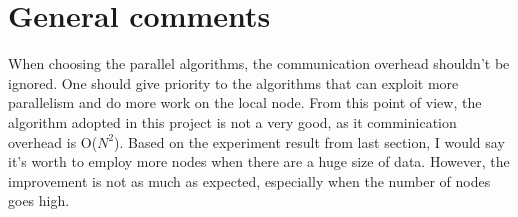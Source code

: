 \documentclass[11pt,letterpaper,oneside]{article}
\begin{document}
% 
\begin{table}[th]
\caption{Result for Sample sort}
\centering
{}
\label{table:table1}
\end{table}



\section{General comments}
When choosing the parallel algorithms, the communication overhead shouldn't be ignored. One should give priority to the algorithms that can exploit more parallelism and do more work on the local node. From this point of view, the algorithm adopted in this project is not a very good, as it comminication overhead is O($N^{2}$). Based on the experiment result from last section, I would say it's worth to employ more nodes when there are a huge size of data. However, the improvement is not as much as expected, especially when the number of nodes goes high.
\end{document}
